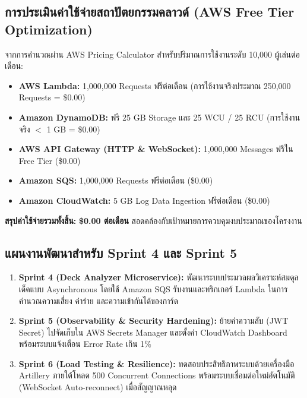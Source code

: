 \documentclass[12pt,a4paper]{article}
\begin{document}
\subsection{การประเมินค่าใช้จ่ายสถาปัตยกรรมคลาวด์ (AWS Free Tier Optimization)}
จากการคำนวณผ่าน AWS Pricing Calculator สำหรับปริมาณการใช้งานระดับ 10,000 ผู้เล่นต่อเดือน:
\begin{itemize}[leftmargin=1.5em, itemsep=2pt]
  \item \textbf{AWS Lambda:} 1,000,000 Requests ฟรีต่อเดือน (การใช้งานจริงประมาณ 250,000 Requests = \$0.00)
  \item \textbf{Amazon DynamoDB:} ฟรี 25 GB Storage และ 25 WCU / 25 RCU (การใช้งานจริง $<$ 1 GB = \$0.00)
  \item \textbf{AWS API Gateway (HTTP \& WebSocket):} 1,000,000 Messages ฟรีใน Free Tier (\$0.00)
  \item \textbf{Amazon SQS:} 1,000,000 Requests ฟรีต่อเดือน (\$0.00)
  \item \textbf{Amazon CloudWatch:} 5 GB Log Data Ingestion ฟรีต่อเดือน (\$0.00)
\end{itemize}

\textbf{สรุปค่าใช้จ่ายรวมทั้งสิ้น:} \textbf{\$0.00 ต่อเดือน} สอดคล้องกับเป้าหมายการควบคุมงบประมาณของโครงงาน

\subsection{แผนงานพัฒนาสำหรับ Sprint 4 และ Sprint 5}
\begin{enumerate}[leftmargin=1.5em, itemsep=2pt]
  \item \textbf{Sprint 4 (Deck Analyzer Microservice):} พัฒนาระบบประมวลผลวิเคราะห์สมดุลเด็คแบบ Asynchronous โดยใช้ Amazon SQS รับงานและทริกเกอร์ Lambda ในการคำนวณความเสี่ยง ค่าร่าย และความเข้ากันได้ของการ์ด
  \item \textbf{Sprint 5 (Observability \& Security Hardening):} ย้ายค่าความลับ (JWT Secret) ไปจัดเก็บใน AWS Secrets Manager และตั้งค่า CloudWatch Dashboard พร้อมระบบแจ้งเตือน Error Rate เกิน 1\%
  \item \textbf{Sprint 6 (Load Testing \& Resilience):} ทดสอบประสิทธิภาพระบบด้วยเครื่องมือ Artillery ภายใต้โหลด 500 Concurrent Connections พร้อมระบบเชื่อมต่อใหม่อัตโนมัติ (WebSocket Auto-reconnect) เมื่อสัญญาณหลุด
\end{enumerate}
\end{document}
